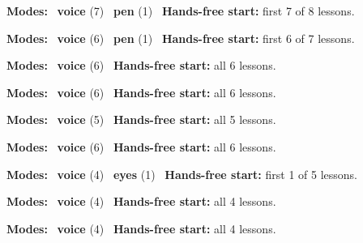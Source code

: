 \expandafter\def\csname hlchaptermodality14\endcsname{%
  {\small\noindent
    \textbf{Modes:} \hlvoicesign{}~\textbf{voice} (7) \quad \hlpensign{}~\textbf{pen} (1)\quad
    \hlvoicesign{}~\textbf{Hands-free start:} first 7 of 8 lessons.%
    \par}\medskip
}

\expandafter\def\csname hlchaptermodality15\endcsname{%
  {\small\noindent
    \textbf{Modes:} \hlvoicesign{}~\textbf{voice} (6) \quad \hlpensign{}~\textbf{pen} (1)\quad
    \hlvoicesign{}~\textbf{Hands-free start:} first 6 of 7 lessons.%
    \par}\medskip
}

\expandafter\def\csname hlchaptermodality16\endcsname{%
  {\small\noindent
    \textbf{Modes:} \hlvoicesign{}~\textbf{voice} (6)\quad
    \hlvoicesign{}~\textbf{Hands-free start:} all 6 lessons.%
    \par}\medskip
}

\expandafter\def\csname hlchaptermodality17\endcsname{%
  {\small\noindent
    \textbf{Modes:} \hlvoicesign{}~\textbf{voice} (6)\quad
    \hlvoicesign{}~\textbf{Hands-free start:} all 6 lessons.%
    \par}\medskip
}

\expandafter\def\csname hlchaptermodality18\endcsname{%
  {\small\noindent
    \textbf{Modes:} \hlvoicesign{}~\textbf{voice} (5)\quad
    \hlvoicesign{}~\textbf{Hands-free start:} all 5 lessons.%
    \par}\medskip
}

\expandafter\def\csname hlchaptermodality19\endcsname{%
  {\small\noindent
    \textbf{Modes:} \hlvoicesign{}~\textbf{voice} (6)\quad
    \hlvoicesign{}~\textbf{Hands-free start:} all 6 lessons.%
    \par}\medskip
}

\expandafter\def\csname hlchaptermodality20\endcsname{%
  {\small\noindent
    \textbf{Modes:} \hlvoicesign{}~\textbf{voice} (4) \quad \hlsightsign{}~\textbf{eyes} (1)\quad
    \hlvoicesign{}~\textbf{Hands-free start:} first 1 of 5 lessons.%
    \par}\medskip
}

\expandafter\def\csname hlchaptermodality21\endcsname{%
  {\small\noindent
    \textbf{Modes:} \hlvoicesign{}~\textbf{voice} (4)\quad
    \hlvoicesign{}~\textbf{Hands-free start:} all 4 lessons.%
    \par}\medskip
}

\expandafter\def\csname hlchaptermodality22\endcsname{%
  {\small\noindent
    \textbf{Modes:} \hlvoicesign{}~\textbf{voice} (4)\quad
    \hlvoicesign{}~\textbf{Hands-free start:} all 4 lessons.%
    \par}\medskip
}

